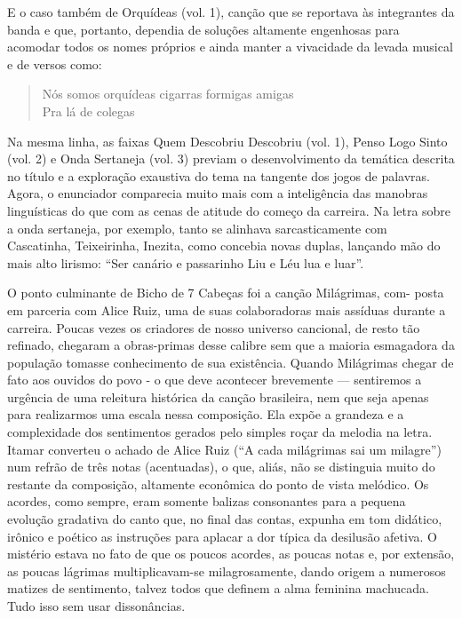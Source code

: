 E o caso também de Orquídeas (vol. 1), canção que se reportava às
integrantes da banda e que, portanto, dependia de soluções altamente
engenhosas para acomodar todos os nomes próprios e ainda manter a
vivacidade da levada musical e de versos como:

\begin{verse}
Nós somos orquídeas cigarras formigas amigas\\
Pra lá de colegas
\end{verse}

Na mesma linha, as faixas Quem Descobriu Descobriu (vol. 1), Penso Logo
Sinto (vol. 2) e Onda Sertaneja (vol. 3) previam o desenvolvimento da
temática descrita no título e a exploração exaustiva do tema na tangente
dos jogos de palavras. Agora, o enunciador comparecia muito mais com a
inteligência das manobras linguísticas do que com as cenas de atitude do
começo da carreira. Na letra sobre a onda sertaneja, por exemplo, tanto
se alinhava sarcasticamente com Cascatinha, Teixeirinha, Inezita, como
concebia novas duplas, lançando mão do mais alto lirismo: ``Ser canário
e passarinho Liu e Léu lua e luar''.

O ponto culminante de Bicho de 7 Cabeças foi a canção Milágrimas, com-
posta em parceria com Alice Ruiz, uma de suas colaboradoras mais
assíduas durante a carreira. Poucas vezes os criadores de nosso universo
cancional, de resto tão refinado, chegaram a obras-primas desse calibre
sem que a maioria esmagadora da população tomasse conhecimento de sua
existência. Quando Milágrimas chegar de fato aos ouvidos do povo - o que
deve acontecer brevemente --- sentiremos a urgência de uma releitura
histórica da canção brasileira, nem que seja apenas para realizarmos uma
escala nessa composição. Ela expõe a grandeza e a complexidade dos
sentimentos gerados pelo simples roçar da melodia na letra. Itamar
converteu o achado de Alice Ruiz (``A cada milágrimas sai um milagre'')
num refrão de três notas (acentuadas), o que, aliás, não se distinguia
muito do restante da composição, altamente econômica do ponto de vista
melódico. Os acordes, como sempre, eram somente balizas consonantes para
a pequena evolução gradativa do canto que, no final das contas, expunha
em tom didático, irônico e poético as instruções para aplacar a dor
típica da desilusão afetiva. O mistério estava no fato de que os poucos
acordes, as poucas notas e, por extensão, as poucas lágrimas
multiplicavam-se milagrosamente, dando origem a numerosos matizes de
sentimento, talvez todos que definem a alma feminina machucada. Tudo
isso sem usar dissonâncias.

